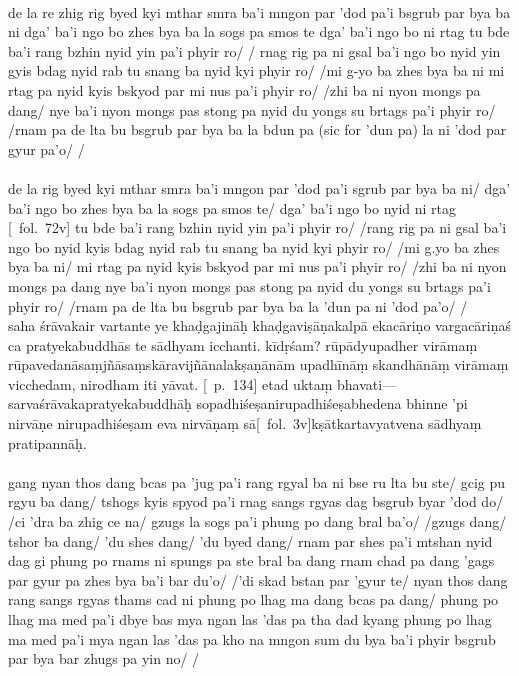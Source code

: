 \documentclass[12pt]{article}
\newcommand{\emdash} {\hspace{0em}—\hspace{0em}}
\begin{document}
\textbf{\TVA}\\
de la re zhig rig byed kyi mthar smra ba'i mngon par 'dod pa'i bsgrub par bya ba ni dga' ba'i ngo bo zhes bya ba la sogs pa smos te dga' ba'i ngo bo ni rtag tu bde ba'i rang bzhin nyid yin pa'i phyir ro/ / rnag rig pa ni gsal ba'i ngo bo nyid yin gyis bdag nyid rab tu snang ba nyid kyi phyir ro/ /mi g-yo ba zhes bya ba ni mi rtag pa nyid kyis bskyod par mi nus pa'i phyir ro/ /zhi ba ni nyon mongs pa dang/ nye ba'i nyon mongs pas stong pa nyid du yongs su brtags pa'i phyir ro/ /rnam pa de lta bu bsgrub par bya ba la bdun pa (sic for 'dun pa) la ni 'dod par gyur pa'o/ /\\

\textbf{\TVB}\\
de la rig byed kyi mthar smra ba'i mngon par 'dod pa'i sgrub par bya ba ni/ dga' ba'i ngo bo zhes bya ba la sogs pa smos te/ dga' ba'i ngo bo nyid ni rtag [\TVB\ fol.\ 72v] tu bde ba'i rang bzhin nyid yin pa'i phyir ro/ /rang rig pa ni gsal ba'i ngo bo nyid kyis bdag nyid rab tu snang ba nyid kyi phyir ro/ /mi g.yo ba zhes bya ba ni/ mi rtag pa nyid kyis bskyod par mi nus pa'i phyir ro/ /zhi ba ni nyon mongs pa dang nye ba'i nyon mongs pas stong pa nyid du yongs su brtags pa'i phyir ro/ /rnam pa de lta bu bsgrub par bya ba la 'dun pa ni 'dod pa'o/ /\\

saha śrāvakair vartante ye khaḍgajināḥ khaḍgaviṣāṇakalpā ekacāriṇo vargacāriṇaś\footnoteB{
	vargacāriṇaś] \MS\ (\emph{cf.\ Abhidharmakośabhāṣya}); vanacāriṇaś \EDD 
} ca pratyekabuddhās te sādhyam icchanti.
kīdṛśam?
rūpādyupadher virāmaṃ rūpavedanāsaṃjñāsaṃskāravijñānalakṣaṇānām upadhīnāṃ skandhānāṃ virāmaṃ vicchedam, nirodham iti yāvat.
[\EDD\ p.\ 134] etad uktaṃ bhavati\emdash sarvaśrāvakapratyekabuddhāḥ sopadhiśeṣanirupadhiśeṣabhedena bhinne 'pi nirvāṇe\footnoteB{
	nirvāṇe] \EDD ; nirvāṇa° \MS
} nirupadhiśeṣam eva nirvāṇaṃ sā[\MS\ fol.\ 3v]kṣātkartavyatvena sādhyaṃ pratipannāḥ.\\

\textbf{\TVA}\\
gang nyan thos dang bcas pa 'jug pa'i rang rgyal ba ni bse ru lta bu ste/ gcig pu rgyu ba dang/ tshogs kyis spyod pa'i rnag sangs rgyas dag bsgrub byar 'dod do/ /ci 'dra ba zhig ce na/ gzugs la sogs pa'i phung po dang bral ba'o/ /gzugs dang/ tshor ba dang/ 'du shes dang/ 'du byed dang/ rnam par shes pa'i mtshan nyid dag gi phung po rnams ni spungs pa ste bral ba dang rnam chad pa dang 'gags par gyur pa zhes bya ba'i bar du'o/ /'di skad bstan par 'gyur te/ nyan thos dang rang sangs rgyas thams cad ni phung po lhag ma dang bcas pa dang/ phung po lhag ma med pa'i dbye bas mya ngan las 'das pa tha dad kyang phung po lhag ma med pa'i mya ngan las 'das pa kho na mngon sum du bya ba'i phyir bsgrub par bya bar zhugs pa yin no/ /\\
\end{document}
